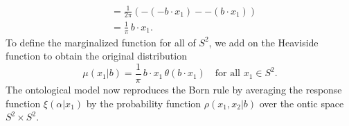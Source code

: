 \documentclass[12pt,draft]{article}
\theoremstyle{definition}
\theoremstyle{plain}
\begin{document}
{\begin{align}
            &= \frac{1}{2\pi} \left( 
                -(-b \cdot x_1) - -(b \cdot x_1)
            \right) \\
            &= \frac{1}{\pi} \, b \cdot x_1.
        \end{align}
        To define the marginalized function for all of
        $S^2$, we add on the Heaviside function to obtain
        the original distribution
        \begin{equation}
            \mu(x_1 | b)
            = \frac{1}{\pi} \, b \cdot x_1 \, \theta(b \cdot
            x_1)
            \quad
            \text{for all } x_1 \in S^2.
        \end{equation}
        The ontological model now reproduces the Born rule
        by averaging the response function $\xi(\alpha|x_1)$ 
        by the probability function $\rho(x_1,x_2|b)$ over
        the ontic space $S^2 \times S^2$.
    }
\end{document}
